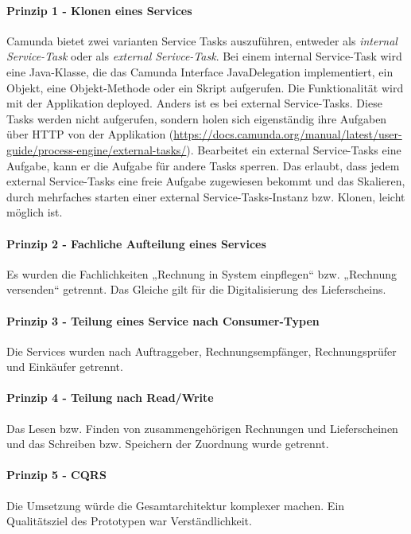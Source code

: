 \paragraph{Prinzip 1 - Klonen eines Services} Camunda bietet zwei varianten Service Tasks auszuführen, entweder als \textit{internal Service-Task} oder als \textit{external Serivce-Task}. Bei einem internal Service-Task wird eine Java-Klasse, die das Camunda Interface JavaDelegation implementiert, ein Objekt, eine Objekt-Methode oder ein Skript aufgerufen. Die Funktionalität wird mit der Applikation deployed. Anders ist es bei external Service-Tasks. Diese Tasks werden nicht aufgerufen, sondern holen sich eigenständig ihre Aufgaben über HTTP von der Applikation (\href{https://docs.camunda.org/manual/latest/user-guide/process-engine/external-tasks/}{https://docs.camunda.org/manual/latest/user-guide/process-engine/external-tasks/}). Bearbeitet ein external Service-Tasks eine Aufgabe, kann er die Aufgabe für andere Tasks sperren. Das erlaubt, dass jedem external Service-Tasks eine freie Aufgabe zugewiesen bekommt und das Skalieren, durch mehrfaches starten einer external Service-Tasks-Instanz bzw. Klonen, leicht möglich ist.

\paragraph{Prinzip 2 - Fachliche Aufteilung eines Services} Es wurden die Fachlichkeiten „Rechnung in System einpflegen“ bzw. „Rechnung versenden“ getrennt. Das Gleiche gilt für die Digitalisierung des Lieferscheins.

\paragraph{Prinzip 3 - Teilung eines Service nach Consumer-Typen} Die Services wurden nach Auftraggeber, Rechnungsempfänger, Rechnungsprüfer und Einkäufer getrennt.

\paragraph{Prinzip 4 - Teilung nach Read/Write} Das Lesen bzw. Finden von zusammengehörigen Rechnungen und Lieferscheinen und das Schreiben bzw. Speichern der Zuordnung wurde getrennt.

\paragraph{Prinzip 5 - CQRS} Die Umsetzung würde die Gesamtarchitektur komplexer machen. Ein Qualitätsziel des Prototypen war Verständlichkeit.


